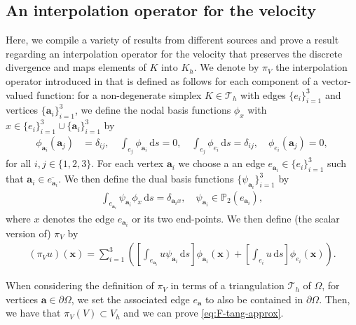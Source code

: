 \documentclass[onefignum,onetabnum]{siamart190516}
\newcommand{\ba}{\boldsymbol{a}}
\newcommand{\bx}{\boldsymbol{x}}
\newcommand{\dd}{\mathrm{d}}
\newcommand{\bbP}{\mathbb{P}}
\newcommand{\Tc}{\mathcal{T}}
\begin{document}
\subsection{An interpolation operator for the velocity}\label{app-subsec:interpolation-V}

Here, we compile a variety of results from different sources and prove a result regarding an interpolation operator for the velocity that preserves the discrete divergence and maps elements of $K$ into $K_h$. We denote by $\pi_V$ the interpolation operator introduced in \cite[Section 3.1]{girault2003} that is defined as follows for each component of a vector-valued function: for a non-degenerate simplex $K\in\Tc_h$ with edges $\{e_i\}_{i = 1}^3$ and vertices $\{\ba_i\}_{i=1}^3$, we define the nodal basis functions $\phi_{x}$ with $x\in \{e_i\}_{i = 1}^3 \cup \{\ba_i\}_{i=1}^3$ by
%
\begin{align*}
	\phi_{\ba_i}(\ba_j) &= \delta_{ij}, \quad \int_{e_j} \phi_{\ba_i}\,\dd s = 0,\quad \int_{e_j} \phi_{e_i}\,\dd s = \delta_{ij}, \quad \phi_{e_i}(\ba_j) = 0,
\end{align*}
%
for all $i,j\in\{1,2,3\}$. For each vertex $\ba_i$ we choose a an edge $e_{\ba_i}\in \{e_i\}_{i = 1}^3$ such that $\ba_i\in \overline{e_{\ba_i}}$. We then define the dual basis functions $\{\psi_{\ba_i}\}_{i=1}^3$ by
%
\begin{align*}
	\int_{e_{\ba_i}}\psi_{\ba_i} \phi_{x}\,\dd s = \delta_{\ba_ix}, \quad \psi_{\ba_i}\in\bbP_2(e_{\ba_i}),
\end{align*}
%
where $x$ denotes the edge $e_{\ba_i}$ or its two end-points. We then define (the scalar version of) $\pi_V$ by 
%
\begin{align*}
	(\pi_V u)(\bx) = \sum_{i = 1}^3 \left( \left[ \int_{e_{\ba_i}} u \psi_{\ba_i}\,\dd s\right] \phi_{\ba_i}(\bx) + \left[ \int_{e_{i}} u \,\dd s\right] \phi_{e_i}(\bx) \right).
\end{align*}

When considering the definition of $\pi_V$ in terms of a triangulation $\Tc_h$ of $\Omega$, for vertices $\ba \in \partial \Omega$, we set the associated edge $e_{\ba}$ to also be contained in $\partial \Omega$. Then, we have that $\pi_V(V)\subset V_h$ and we can prove \eqref{eq:F-tang-approx}.
\end{document}
